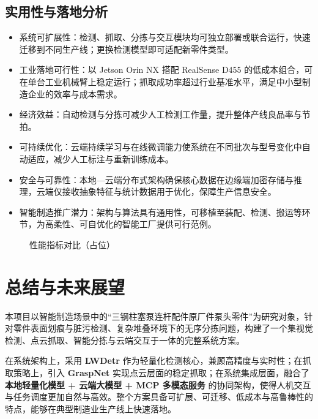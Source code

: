 \documentclass{cumcmthesis}
\begin{document}
\subsection{实用性与落地分析}

\begin{itemize}
    \item 系统可扩展性：检测、抓取、分拣与交互模块均可独立部署或联合运行，快速迁移到不同生产线；更换检测模型即可适配新零件类型。
    \item 工业落地可行性：以 Jetson Orin NX 搭配 RealSense D455 的低成本组合，可在单台工业机械臂上稳定运行；抓取成功率超过行业基准水平，满足中小型制造企业的效率与成本需求。
    \item 经济效益：自动检测与分拣可减少人工检测工作量，提升整体产线良品率与节拍。
    \item 可持续优化：云端持续学习与在线微调能力使系统在不同批次与型号变化中自动适应，减少人工标注与重新训练成本。
    \item 安全与可靠性：本地—云端分布式架构确保核心数据在边缘端加密存储与推理，云端仅接收抽象特征与统计数据用于优化，保障生产信息安全。
    \item 智能制造推广潜力：架构与算法具有通用性，可移植至装配、检测、搬运等环节，为高柔性、可自优化的智能工厂提供可行范例。
\end{itemize}

\begin{figure}[htbp]\centering
{}
\caption{性能指标对比（占位）}\label{fig:metrics}
\end{figure}

\section{总结与未来展望}

本项目以智能制造场景中的“三钢柱塞泵连杆配件原厂件泵头零件”为研究对象，针对零件表面划痕与脏污检测、复杂堆叠环境下的无序分拣问题，构建了一个集视觉检测、点云抓取、智能分拣与云端交互于一体的完整系统方案。

在系统架构上，采用 \textbf{LWDetr} 作为轻量化检测核心，兼顾高精度与实时性；在抓取策略上，引入 \textbf{GraspNet} 实现点云层面的稳定抓取；在系统集成层面，融合了 \textbf{本地轻量化模型 + 云端大模型 + MCP 多模态服务} 的协同架构，使得人机交互与任务调度更加自然与高效。整个方案具备可扩展、可迁移、低成本与高鲁棒性的特点，能够在典型制造业生产线上快速落地。
\end{document}
